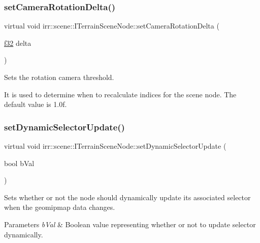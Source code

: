 \subsubsection{\texorpdfstring{set\+Camera\+Rotation\+Delta()}{setCameraRotationDelta()}\hspace{0.1cm}{\footnotesize\ttfamily [2/2]}}
{\footnotesize\ttfamily virtual void irr\+::scene\+::\+I\+Terrain\+Scene\+Node\+::set\+Camera\+Rotation\+Delta (\begin{DoxyParamCaption}\item[{\hyperlink{namespaceirr_a0277be98d67dc26ff93b1a6a1d086b07}{f32}}]{delta }\end{DoxyParamCaption})\hspace{0.3cm}{\ttfamily [pure virtual]}}



Sets the rotation camera threshold. 

It is used to determine when to recalculate indices for the scene node. The default value is 1.\+0f. \mbox{\label{classirr_1_1scene_1_1ITerrainSceneNode_a95cf695e54f1ef3376f7a3666c2dd834}} 
\subsubsection{\texorpdfstring{set\+Dynamic\+Selector\+Update()}{setDynamicSelectorUpdate()}\hspace{0.1cm}{\footnotesize\ttfamily [1/2]}}
{\footnotesize\ttfamily virtual void irr\+::scene\+::\+I\+Terrain\+Scene\+Node\+::set\+Dynamic\+Selector\+Update (\begin{DoxyParamCaption}\item[{bool}]{b\+Val }\end{DoxyParamCaption})\hspace{0.3cm}{\ttfamily [pure virtual]}}



Sets whether or not the node should dynamically update its associated selector when the geomipmap data changes. 


\begin{DoxyParams}{Parameters}
{\em b\+Val} & Boolean value representing whether or not to update selector dynamically. \\
\hline
\end{DoxyParams}
\mbox{\label{classirr_1_1scene_1_1ITerrainSceneNode_a95cf695e54f1ef3376f7a3666c2dd834}} 
